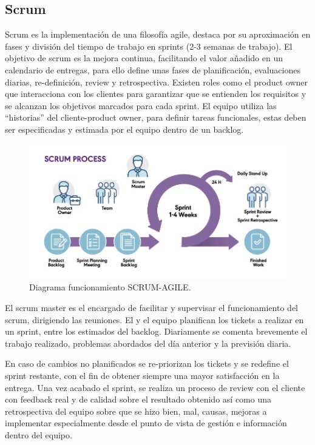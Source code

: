 \subsection{Scrum}
Scrum es la implementación de una filosofía agile, destaca por su aproximación en fases y división del tiempo de trabajo en sprints (2-3 semanas de trabajo). El objetivo de scrum es la mejora continua, facilitando el valor añadido en un calendario de entregas, para ello define unas fases de planificación, evaluaciones diarias, re-definición, review y retrospectiva. Existen roles como el product owner que interacciona con los clientes para garantizar que se entienden los requisitos y se alcanzan los objetivos marcados para cada sprint. El equipo utiliza las “historias” del cliente-product owner, para definir tareas funcionales, estas deben ser especificadas y estimada por el equipo dentro de un backlog.

\begin{figure}[!htb]
\begin{center}
\includegraphics[width=1\textwidth]{./figuras/scrum}
\caption{Diagrama funcionamiento SCRUM-AGILE\cite{i_scrum}.}
\label{F:scrum}
\end{center}
\end{figure}
El scrum master es el encargado de facilitar y supervisar el funcionamiento del scrum, dirigiendo las reuniones. El y el equipo planifican los tickets a realizar en un sprint, entre los estimados del backlog. Diariamente se comenta brevemente el trabajo realizado, problemas abordados del día anterior y la previsión diaria.

En caso de cambios no planificados se re-priorizan los tickets y se redefine el sprint restante, con el fin de obtener siempre una mayor satisfacción en la entrega. Una vez acabado el sprint, se realiza un proceso de review con el cliente con feedback real y de calidad sobre el resultado obtenido así como una retrospectiva del equipo sobre que se hizo bien, mal, causas, mejoras a implementar especialmente desde el punto de vista de gestión e información dentro del equipo.

